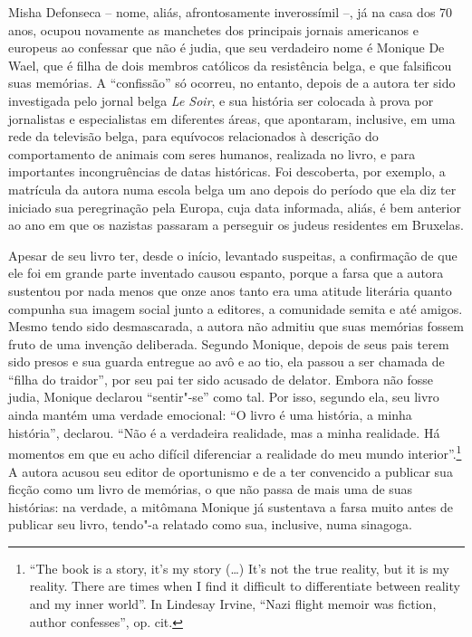 Misha Defonseca -- nome, aliás, afrontosamente inverossímil --, já na
casa dos 70 anos, ocupou novamente as manchetes dos principais jornais
americanos e europeus ao confessar que não é judia, que seu verdadeiro
nome é Monique De Wael, que é filha de dois membros católicos da
resistência belga, e que falsificou suas memórias. A ``confissão'' só
ocorreu, no entanto, depois de a autora ter sido investigada pelo jornal
belga \emph{Le Soir}, e sua história ser colocada à prova por
jornalistas e especialistas em diferentes áreas, que apontaram,
inclusive, em uma rede da televisão belga, para equívocos relacionados à
descrição do comportamento de animais com seres humanos, realizada no
livro, e para importantes incongruências de datas históricas. Foi
descoberta, por exemplo, a matrícula da autora numa escola belga um ano
depois do período que ela diz ter iniciado sua peregrinação pela Europa,
cuja data informada, aliás, é bem anterior ao ano em que os nazistas
passaram a perseguir os judeus residentes em Bruxelas.

Apesar de seu livro ter, desde o início, levantado suspeitas, a
confirmação de que ele foi em grande parte inventado causou espanto,
porque a farsa que a autora sustentou por nada menos que onze anos tanto
era uma atitude literária quanto compunha sua imagem social junto a
editores, a comunidade semita e até amigos. Mesmo tendo sido
desmascarada, a autora não admitiu que suas memórias fossem fruto de uma
invenção deliberada. Segundo Monique, depois de seus pais terem sido
presos e sua guarda entregue ao avô e ao tio, ela passou a ser chamada
de ``filha do traidor'', por seu pai ter sido acusado de delator. Embora
não fosse judia, Monique declarou ``sentir"-se'' como tal. Por isso,
segundo ela, seu livro ainda mantém uma verdade emocional: ``O livro é
uma história, a minha história'', declarou. ``Não é a verdadeira
realidade, mas a minha realidade. Há momentos em que eu acho difícil
diferenciar a realidade do meu mundo interior''.\footnote{``The book is
  a story, it's my story (\ldots{}) It's not the true reality, but it is my
  reality. There are times when I find it difficult to differentiate
  between reality and my inner world''. In Lindesay Irvine, ``Nazi
  flight memoir was fiction, author confesses'', op. cit.} A autora
acusou seu editor de oportunismo e de a ter convencido a publicar sua
ficção como um livro de memórias, o que não passa de mais uma de suas
histórias: na verdade, a mitômana Monique já sustentava a farsa muito
antes de publicar seu livro, tendo"-a relatado como sua, inclusive, numa
sinagoga.

